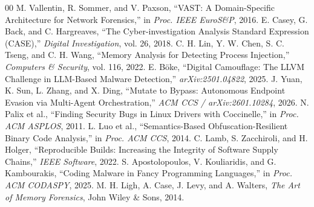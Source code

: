 \documentclass[10pt,conference]{IEEEtran}
\begin{document}
\begin{thebibliography}{00}
 M. Vallentin, R. Sommer, and V. Paxson, ``VAST: A Domain-Specific Architecture for Network Forensics,'' in \textit{Proc. IEEE EuroS\&P}, 2016.
 E. Casey, G. Back, and C. Hargreaves, ``The Cyber-investigation Analysis Standard Expression (CASE),'' \textit{Digital Investigation}, vol. 26, 2018.
 C. H. Lin, Y. W. Chen, S. C. Tseng, and C. H. Wang, ``Memory Analysis for Detecting Process Injection,'' \textit{Computers \& Security}, vol. 116, 2022.
 E. Böke, ``Digital Camouflage: The LLVM Challenge in LLM-Based Malware Detection,'' \textit{arXiv:2501.04822}, 2025.
 J. Yuan, K. Sun, L. Zhang, and X. Ding, ``Mutate to Bypass: Autonomous Endpoint Evasion via Multi-Agent Orchestration,'' \textit{ACM CCS / arXiv:2601.10284}, 2026.
 N. Palix et al., ``Finding Security Bugs in Linux Drivers with Coccinelle,'' in \textit{Proc. ACM ASPLOS}, 2011.
 L. Luo et al., ``Semantics-Based Obfuscation-Resilient Binary Code Analysis,'' in \textit{Proc. ACM CCS}, 2014.
 C. Lamb, S. Zacchiroli, and H. Holger, ``Reproducible Builds: Increasing the Integrity of Software Supply Chains,'' \textit{IEEE Software}, 2022.
 S. Apostolopoulos, V. Kouliaridis, and G. Kambourakis, ``Coding Malware in Fancy Programming Languages,'' in \textit{Proc. ACM CODASPY}, 2025.
 M. H. Ligh, A. Case, J. Levy, and A. Walters, \textit{The Art of Memory Forensics}, John Wiley \& Sons, 2014.
\end{thebibliography}
\end{document}
